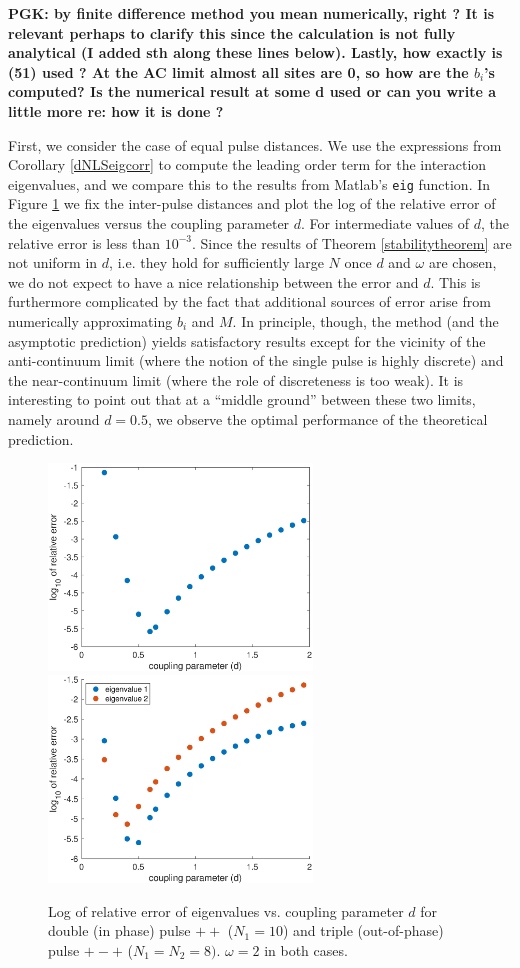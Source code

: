 \documentclass[12pt]{article}
\begin{document}
{\bf PGK: by finite difference method you mean
numerically, right ? It is relevant perhaps to clarify
this since the calculation is not fully analytical (I added sth along these lines below). Lastly, how exactly
is (51) used ? At the AC limit almost all sites are 0,
so how are the $b_i$'s computed? Is the numerical result
at some d used or can you write a little more re: how it
is done ?}

First, we consider the case of equal pulse distances. We use the expressions from Corollary \ref{dNLSeigcorr} to compute the leading order term for the interaction eigenvalues, and we compare this to the results from Matlab's \texttt{eig} function. In Figure \ref{fig:error1} we fix the inter-pulse distances and plot the log of the relative error of the eigenvalues versus the coupling parameter $d$. For intermediate values of $d$, the relative error is less than $10^{-3}$. Since the results of Theorem \eqref{stabilitytheorem} are not uniform in $d$, i.e. they hold for sufficiently large $N$ once $d$ and $\omega$ are chosen, we do not expect to have a nice relationship between the error and $d$. This is furthermore complicated by the fact that additional sources of error arise from  
numerically approximating $b_i$ and $M$. In principle, though, the method (and the asymptotic prediction) yields
satisfactory results except for the vicinity of the 
anti-continuum limit (where the notion of the single
pulse is highly discrete) and the near-continuum limit
(where the role of discreteness is too weak). 
It is interesting to point out that at a ``middle
ground'' between these two limits, namely around $d=0.5$,
we observe the optimal performance of the theoretical
prediction. 

\begin{figure}[H]
\centering
\includegraphics[width=7cm]{errors1.eps}
\includegraphics[width=7cm]{errors2.eps}
\caption{Log of relative error of eigenvalues vs. coupling parameter $d$ for double (in phase) 
pulse $++$ ($N_1 = 10$) and triple (out-of-phase) pulse $+-+$ ($N_1 = N_2 = 8)$. $\omega = 2$ in both cases.}
\label{fig:error1}
\end{figure}
\end{document}
